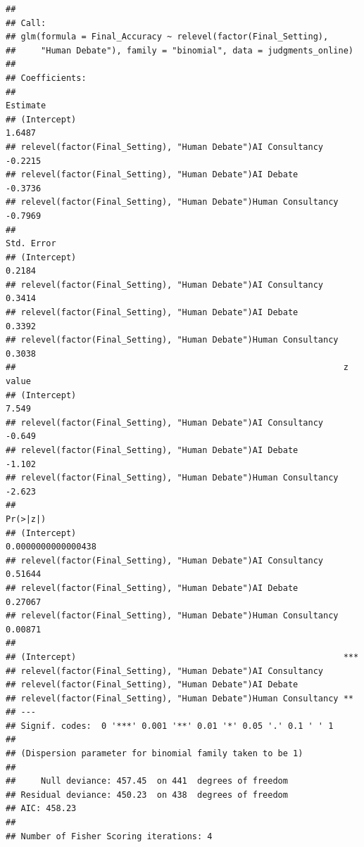 \documentclass[
]{article}
\newenvironment{Shaded}{\begin{snugshade}}{\end{snugshade}}
\newcommand{\FloatTok}[1]{\textcolor[rgb]{0.00,0.00,0.81}{#1}}
\newcommand{\FunctionTok}[1]{\textcolor[rgb]{0.13,0.29,0.53}{\textbf{#1}}}
\newcommand{\NormalTok}[1]{#1}
\newcommand{\SpecialCharTok}[1]{\textcolor[rgb]{0.81,0.36,0.00}{\textbf{#1}}}
\begin{document}
\begin{verbatim}
## 
## Call:
## glm(formula = Final_Accuracy ~ relevel(factor(Final_Setting), 
##     "Human Debate"), family = "binomial", data = judgments_online)
## 
## Coefficients:
##                                                                 Estimate
## (Intercept)                                                       1.6487
## relevel(factor(Final_Setting), "Human Debate")AI Consultancy     -0.2215
## relevel(factor(Final_Setting), "Human Debate")AI Debate          -0.3736
## relevel(factor(Final_Setting), "Human Debate")Human Consultancy  -0.7969
##                                                                 Std. Error
## (Intercept)                                                         0.2184
## relevel(factor(Final_Setting), "Human Debate")AI Consultancy        0.3414
## relevel(factor(Final_Setting), "Human Debate")AI Debate             0.3392
## relevel(factor(Final_Setting), "Human Debate")Human Consultancy     0.3038
##                                                                 z value
## (Intercept)                                                       7.549
## relevel(factor(Final_Setting), "Human Debate")AI Consultancy     -0.649
## relevel(factor(Final_Setting), "Human Debate")AI Debate          -1.102
## relevel(factor(Final_Setting), "Human Debate")Human Consultancy  -2.623
##                                                                           Pr(>|z|)
## (Intercept)                                                     0.0000000000000438
## relevel(factor(Final_Setting), "Human Debate")AI Consultancy               0.51644
## relevel(factor(Final_Setting), "Human Debate")AI Debate                    0.27067
## relevel(factor(Final_Setting), "Human Debate")Human Consultancy            0.00871
##                                                                    
## (Intercept)                                                     ***
## relevel(factor(Final_Setting), "Human Debate")AI Consultancy       
## relevel(factor(Final_Setting), "Human Debate")AI Debate            
## relevel(factor(Final_Setting), "Human Debate")Human Consultancy ** 
## ---
## Signif. codes:  0 '***' 0.001 '**' 0.01 '*' 0.05 '.' 0.1 ' ' 1
## 
## (Dispersion parameter for binomial family taken to be 1)
## 
##     Null deviance: 457.45  on 441  degrees of freedom
## Residual deviance: 450.23  on 438  degrees of freedom
## AIC: 458.23
## 
## Number of Fisher Scoring iterations: 4
\end{verbatim}

\begin{Shaded}
\end{Shaded}
\end{document}
